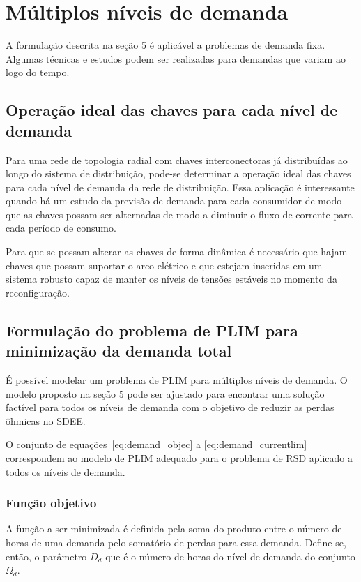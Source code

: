 \section{Múltiplos níveis de demanda}

A formulação descrita na seção 5 é aplicável a problemas de demanda fixa.
Algumas técnicas e estudos podem ser realizadas para demandas que variam ao logo do tempo.

\subsection{Operação ideal das chaves para cada nível de demanda}

Para uma rede de topologia radial com chaves interconectoras já distribuídas ao longo do sistema de distribuição, pode-se determinar a operação ideal das chaves para cada nível de demanda da rede de distribuição.
Essa aplicação é interessante quando há um estudo da previsão de demanda para cada consumidor de modo que as chaves possam ser alternadas de modo a diminuir o fluxo de corrente para cada período de consumo.

Para que se possam alterar as chaves de forma dinâmica é necessário que hajam chaves que possam suportar o arco elétrico e que estejam inseridas em um sistema robusto capaz de manter os níveis de tensões estáveis no momento da reconfiguração.

\subsection{Formulação do problema de PLIM para minimização da demanda total}

É possível modelar um problema de PLIM para múltiplos níveis de demanda.
O modelo proposto na seção 5 pode ser ajustado para encontrar uma solução factível para todos os níveis de demanda com o objetivo de reduzir as perdas ôhmicas no SDEE.

O conjunto de equações~\eqref{eq:demand_objec} a \eqref{eq:demand_currentlim} correspondem ao modelo de PLIM adequado para o problema de RSD aplicado a todos os níveis de demanda.

\subsubsection{Função objetivo}
A função a ser minimizada é definida pela soma do produto entre o número de horas de uma demanda pelo somatório de perdas para essa demanda.
Define-se, então, o parâmetro $D_d$ que é o número de horas do nível de demanda do conjunto $\Omega_d$.


